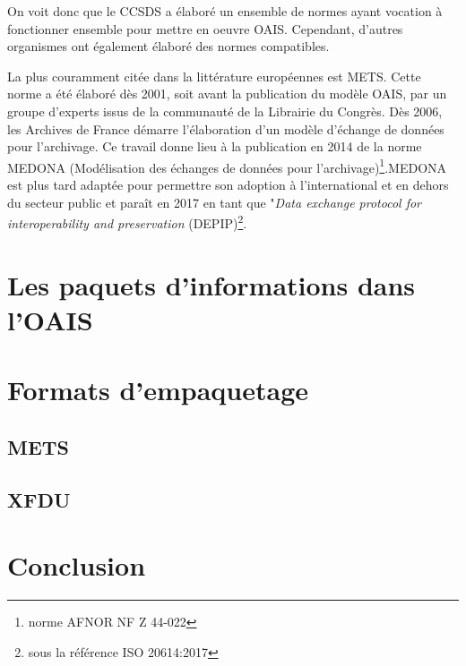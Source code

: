\documentclass[12pt,a4paper]{article} %
\begin{document}
On voit donc que le CCSDS a élaboré un ensemble de normes ayant vocation à fonctionner ensemble pour mettre en oeuvre OAIS. Cependant, d'autres organismes ont également élaboré des normes compatibles. 

La plus couramment citée dans la littérature européennes est METS. Cette norme a été élaboré dès 2001, soit avant la publication du modèle OAIS, par un groupe d'experts issus de la communauté de la Librairie du Congrès. Dès 2006, les Archives de France démarre l'élaboration d'un modèle d'échange de données pour l'archivage. Ce travail donne lieu à la publication en 2014 de la norme MEDONA (Modélisation des échanges de données pour l'archivage)\footnote{norme AFNOR NF Z 44-022}.MEDONA est plus tard adaptée pour permettre son adoption à l'international et en dehors du secteur public et paraît en 2017 en tant que "\textit{Data exchange protocol for interoperability and preservation} (DEPIP)\footnote{sous la référence ISO 20614:2017}.


\section{Les paquets d'informations dans l'OAIS}

\section{Formats d'empaquetage}

\subsection{METS}

\subsection{XFDU}

\section{Conclusion}


\printbibliography

\tableofcontents %
\end{document}

